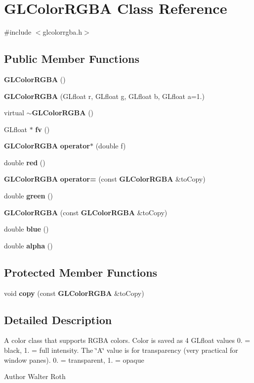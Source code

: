 \section{\-G\-L\-Color\-R\-G\-B\-A \-Class \-Reference}
\label{d5/d16/classGLColorRGBA}


{\ttfamily \#include $<$glcolorrgba.\-h$>$}

\subsection*{\-Public \-Member \-Functions}
\begin{DoxyCompactItemize}
\item 
{\bf \-G\-L\-Color\-R\-G\-B\-A} ()
\item 
{\bf \-G\-L\-Color\-R\-G\-B\-A} (\-G\-Lfloat r, \-G\-Lfloat g, \-G\-Lfloat b, \-G\-Lfloat a=1.)
\item 
virtual {\bf $\sim$\-G\-L\-Color\-R\-G\-B\-A} ()
\item 
\-G\-Lfloat $\ast$ {\bf fv} ()
\item 
{\bf \-G\-L\-Color\-R\-G\-B\-A} {\bf operator$\ast$} (double f)
\item 
double {\bf red} ()
\item 
{\bf \-G\-L\-Color\-R\-G\-B\-A} {\bf operator=} (const {\bf \-G\-L\-Color\-R\-G\-B\-A} \&to\-Copy)
\item 
double {\bf green} ()
\item 
{\bf \-G\-L\-Color\-R\-G\-B\-A} (const {\bf \-G\-L\-Color\-R\-G\-B\-A} \&to\-Copy)
\item 
double {\bf blue} ()
\item 
double {\bf alpha} ()
\end{DoxyCompactItemize}
\subsection*{\-Protected \-Member \-Functions}
\begin{DoxyCompactItemize}
\item 
void {\bf copy} (const {\bf \-G\-L\-Color\-R\-G\-B\-A} \&to\-Copy)
\end{DoxyCompactItemize}


\subsection{\-Detailed \-Description}
\-A color class that supports \-R\-G\-B\-A colors. \-Color is saved as 4 \-G\-Lfloat values 0. = black, 1. = full intensity. \-The \char`\"{}\-A\char`\"{} value is for transparency (very practical for window panes). 0. = transparent, 1. = opaque \begin{DoxyAuthor}{\-Author}
\-Walter \-Roth 
\end{DoxyAuthor}


